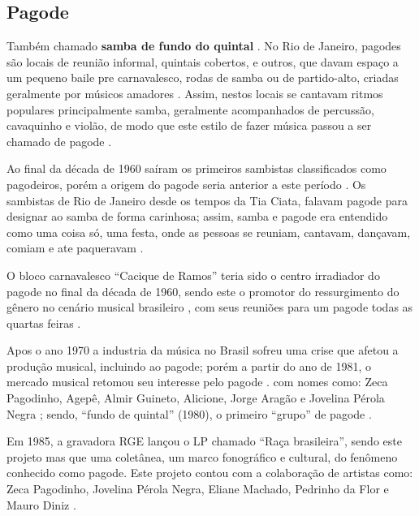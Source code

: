 \subsection{Pagode}
Também chamado \textbf{samba de fundo do quintal}  \cite[pp. 130]{perna2002samba}.
No Rio de Janeiro, pagodes são locais de reunião informal, quintais cobertos, e outros,
que davam espaço a um pequeno baile pre carnavalesco, 
rodas de samba ou de partido-alto, criadas geralmente por músicos amadores \cite[pp. 130]{perna2002samba} \cite[pp. 241]{dourado2004dicionario} \cite[pp. 241]{dourado2004dicionario}.
Assim, nestos locais se cantavam ritmos populares principalmente samba,
geralmente acompanhados de percussão, cavaquinho e violão, 
de modo que este  estilo de fazer música passou a ser chamado de pagode \cite[pp. 63]{reinato2010musica}  \cite[pp. 130]{perna2002samba}.

Ao final da década de 1960 saíram os primeiros sambistas classificados como pagodeiros,
porém a origem do pagode seria anterior a este período \cite{sedano2018bezerra}.
Os sambistas de Rio de Janeiro desde os tempos da Tia Ciata, 
falavam pagode para designar ao samba de forma carinhosa; 
assim, samba e pagode era entendido como uma coisa só, uma festa, 
onde as pessoas se reuniam, cantavam, dançavam, comiam e ate paqueravam \cite[pp. 209]{diniz2006almanaque}.

O bloco carnavalesco ``Cacique de Ramos'' teria sido o centro irradiador do pagode no final da década de 1960,
sendo este o promotor do ressurgimento do gênero no cenário musical brasileiro \cite{sedano2018bezerra},
com seus reuniões  para um pagode todas as quartas feiras  \cite[pp. 210]{diniz2006almanaque}.

Apos o ano 1970 a industria da música no Brasil sofreu uma crise que afetou a produção musical, 
incluindo ao pagode;
porém a partir do ano de 1981, o mercado musical retomou seu interesse pelo pagode \cite{sedano2018bezerra}.
com nomes como: Zeca Pagodinho, Agepê, Almir Guineto, Alicione, 
Jorge Aragão e Jovelina Pérola Negra \cite[pp. 130]{perna2002samba} \cite{sedano2018bezerra};
sendo, ``fundo de quintal'' (1980), o primeiro ``grupo'' de pagode \cite[pp. 130]{perna2002samba} \cite{fundodequintal}.

Em 1985, a gravadora RGE lançou o LP chamado  ``Raça brasileira'', 
sendo este projeto mas que uma coletânea, um marco fonográfico e cultural,
do fenômeno conhecido como pagode. Este projeto contou com a colaboração de artistas como:
Zeca Pagodinho, 
Jovelina Pérola Negra, 
Eliane Machado,
Pedrinho da Flor e
Mauro Diniz \cite[pp. 211]{diniz2006almanaque}.

